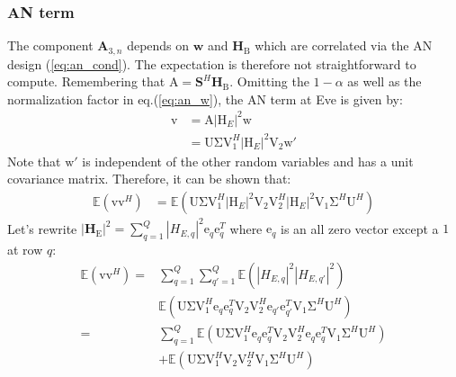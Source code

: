 \documentclass[journal,comsoc]{IEEEtran}
\newcommand{\HE}{\textbf{H}_{\text{E}}}
\newcommand{\HB}{\textbf{H}_{\text{B}}}
\newcommand{\spread}{\textbf{S}}
\newcommand{\vect}[1]{\boldsymbol{\mathrm{#1}}}
\newcommand{\mat}[1]{\boldsymbol{\mathrm{#1}}}
\begin{document}
\subsubsection{AN term}\label{sec:an-term-app-2}
The component $\textbf{A}_{3,n}$ depends on $\textbf{w}$ and $\HB$ which are correlated via the AN design (\ref{eq:an_cond}). The expectation is therefore not straightforward to compute. Remembering that $\mat{A} = \spread^H \HB$. Omitting the $1-\alpha$ as well as the normalization  factor in eq.(\ref{eq:an_w}), the AN term at Eve is given by:
\begin{equation}
	\begin{split}
	\vect{v}&=\mat{A} |\mat{H}_E|^2 \vect{w} \label{eq:an_decod1_a}\\
	&=\mat{U} \mat{\Sigma}\mat{V}_1^H |\mat{H}_E|^2 \mat{V}_2 \vect{w}'
	\end{split}
\end{equation}
Note that $\vect{w}'$ is independent of the other random variables and has a unit covariance matrix. Therefore, it can be shown that:
\begin{align}
\mathbb{E}\left(\vect{v}\vect{v}^H\right)&=\mathbb{E}\left(\mat{U} \mat{\Sigma}\mat{V}_1^H |\mat{H}_E|^2 \mat{V}_2 \mat{V}_2^H|\mat{H}_E|^2\mat{V}_1 \mat{\Sigma}^H   \mat{U}^H\right)
\end{align}
Let's rewrite $|\HE|^2=\sum_{q=1}^Q|H_{E,q}|^2 \vect{e}_q \vect{e}_q^T $ where $\vect{e}_q$ is an all zero vector except a $1$ at row $q$:
\begin{equation}
	\begin{split}
	\mathbb{E}\left(\vect{v}\vect{v}^H\right)=&\sum_{q=1}^Q\sum_{q'=1}^Q\mathbb{E}(|H_{E,q}|^2|H_{E,q'}|^2)\\
	&\mathbb{E}\left(\mat{U} \mat{\Sigma}\mat{V}_1^H  \vect{e}_q \vect{e}_q^T \mat{V}_2 \mat{V}_2^H \vect{e}_{q'} \vect{e}_{q'}^T\mat{V}_1 \mat{\Sigma}^H   \mat{U}^H\right)\\
	=&\sum_{q=1}^Q\mathbb{E}\left(\mat{U} \mat{\Sigma}\mat{V}_1^H  \vect{e}_q \vect{e}_q^T \mat{V}_2 \mat{V}_2^H \vect{e}_{q} \vect{e}_{q}^T\mat{V}_1 \mat{\Sigma}^H   \mat{U}^H\right)\\
	&+\mathbb{E}\left(\mat{U} \mat{\Sigma}\mat{V}_1^H  \mat{V}_2 \mat{V}_2^H \mat{V}_1 \mat{\Sigma}^H   \mat{U}^H\right)
	\end{split}
\end{equation}
\end{document}
